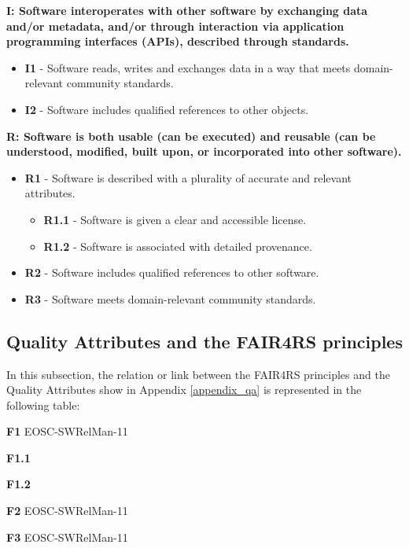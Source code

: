\textbf{I: Software interoperates with other software by exchanging data and/or metadata, and/or
through interaction via application programming interfaces (APIs), described through
standards.}

\begin{itemize}
    \item \textbf{I1} - Software reads, writes and exchanges data in a way that meets domain-relevant community standards.
    \item \textbf{I2} - Software includes qualified references to other objects.
\end{itemize}

\textbf{R: Software is both usable (can be executed) and reusable (can be understood, modified, built
upon, or incorporated into other software).}

\begin{itemize}
    \item \textbf{R1} - Software is described with a plurality of accurate and relevant attributes.

    \begin{itemize}
        \item \textbf{R1.1} - Software is given a clear and accessible license.
        \item \textbf{R1.2} - Software is associated with detailed provenance.
    \end{itemize}

    \item \textbf{R2} - Software includes qualified references to other software.
    \item \textbf{R3} - Software meets domain-relevant community standards.
\end{itemize}

\subsection{Quality Attributes and the FAIR4RS principles}

In this subsection, the relation or link between the FAIR4RS principles and the Quality Attributes
show in Appendix \ref{appendix_qa} is represented in the following table:

\textbf{F1} EOSC-SWRelMan-11

\textbf{F1.1}

\textbf{F1.2}

\textbf{F2} EOSC-SWRelMan-11

\textbf{F3} EOSC-SWRelMan-11

